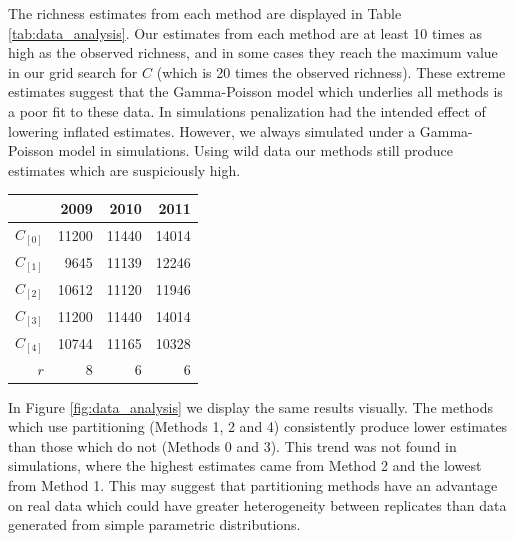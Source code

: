 \documentclass[oupdraft]{bio}
\begin{document}
The richness estimates from each method are displayed in Table \ref{tab:data_analysis}.  Our estimates from each method are at least 10 times as high as the observed richness, and in some cases they reach the maximum value in our grid search for $C$ (which is 20 times the observed richness).  These extreme estimates suggest that the Gamma-Poisson model which underlies all methods is a poor fit to these data.  In simulations penalization had the intended effect of lowering inflated estimates.  However, we always simulated under a Gamma-Poisson model in simulations.  Using wild data our methods still produce estimates which are suspiciously high.

\begin{table}[t]
\centering
\begin{tabular}{|r|r|r|r|}
  \hline
& 2009  & 2010 & 2011 \\
  \hline
$\widehat{C}_{[0]}$ & 11200 & 11440 & 14014 \\
  $\widehat{C}_{[1]}$ & 9645 & 11139 & 12246 \\
  $\widehat{C}_{[2]}$ & 10612 & 11120 & 11946 \\
  $\widehat{C}_{[3]}$ & 11200 & 11440 & 14014 \\
  $\widehat{C}_{[4]}$ & 10744 & 11165 & 10328 \\
   \hline
     $r$ & 8 & 6 & 6 \\
  \hline
\end{tabular}
\end{table}

In Figure \ref{fig:data_analysis} we display the same results visually.  The methods which use partitioning (Methods 1, 2 and 4) consistently produce lower estimates than those which do not (Methods 0 and 3).  This trend was not found in simulations, where the highest estimates came from Method 2 and the lowest from Method 1.  This may suggest that partitioning methods have an advantage on real data which could have greater heterogeneity between replicates than data generated from simple parametric distributions.
\end{document}
